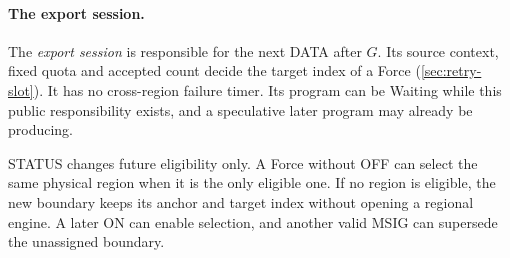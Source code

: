\documentclass[11pt,a4paper]{article}
\newcommand{\defterm}[1]{\textcolor{rrBlue}{\textit{#1}}}
\begin{document}
\paragraph{The export session.}
The \defterm{export session} is responsible for the next DATA after $G$.
Its source context, fixed quota and accepted count decide the target
index of a Force (\cref{sec:retry-slot}). It has no cross-region failure
timer. Its program can be Waiting while this public responsibility
exists, and a speculative later program may already be producing.

STATUS changes future eligibility only. A Force without OFF can select
the same physical region when it is the only eligible one. If no region
is eligible, the new boundary keeps its anchor and target index without
opening a regional engine. A later ON can enable selection, and another
valid MSIG can supersede the unassigned boundary.
\end{document}
